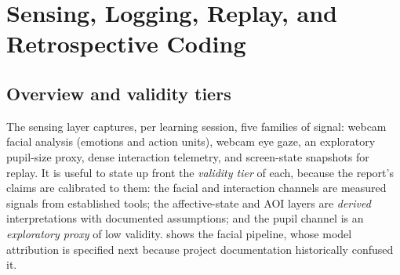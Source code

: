 \chapter{Sensing, Logging, Replay, and Retrospective Coding}
\label{ch:sensing}


\section{Overview and validity tiers}
\label{sec:sensing-overview}

The sensing layer captures, per learning session, five families of
signal: webcam facial analysis (emotions and action units), webcam eye
gaze, an exploratory pupil-size proxy, dense interaction telemetry, and
screen-state snapshots for replay. It is useful to state up front the
\emph{validity tier} of each, because the report's claims are calibrated
to them: the facial and interaction channels are measured signals from
established tools; the affective-state and AOI layers are \emph{derived}
interpretations with documented assumptions; and the pupil channel is an
\emph{exploratory proxy} of low validity. 
shows the facial pipeline, whose model attribution is specified next
because project documentation historically confused it.


